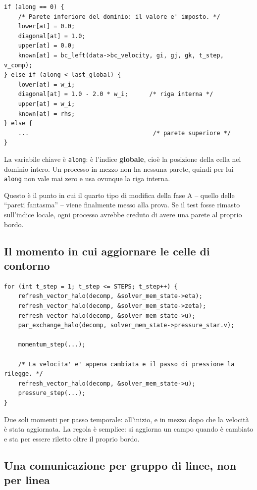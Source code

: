 \documentclass[11pt,a4paper]{article}
\newcommand{\cd}[1]{\texttt{\small #1}}
\begin{document}
\begin{lstlisting}
if (along == 0) {
    /* Parete inferiore del dominio: il valore e' imposto. */
    lower[at] = 0.0;
    diagonal[at] = 1.0;
    upper[at] = 0.0;
    known[at] = bc_left(data->bc_velocity, gi, gj, gk, t_step, v_comp);
} else if (along < last_global) {
    lower[at] = w_i;
    diagonal[at] = 1.0 - 2.0 * w_i;      /* riga interna */
    upper[at] = w_i;
    known[at] = rhs;
} else {
    ...                                   /* parete superiore */
}
\end{lstlisting}

La variabile chiave è \cd{along}: è l'indice \textbf{globale}, cioè la
posizione della cella nel dominio intero. Un processo in mezzo non ha nessuna
parete, quindi per lui \cd{along} non vale mai zero e usa ovunque la riga
interna.

Questo è il punto in cui il quarto tipo di modifica della fase A -- quello
delle ``pareti fantasma'' -- viene finalmente messo alla prova. Se il test
fosse rimasto sull'indice locale, ogni processo avrebbe creduto di avere una
parete al proprio bordo.

\subsection*{Il momento in cui aggiornare le celle di contorno}

\begin{lstlisting}
for (int t_step = 1; t_step <= STEPS; t_step++) {
    refresh_vector_halo(decomp, &solver_mem_state->eta);
    refresh_vector_halo(decomp, &solver_mem_state->zeta);
    refresh_vector_halo(decomp, &solver_mem_state->u);
    par_exchange_halo(decomp, solver_mem_state->pressure_star.v);

    momentum_step(...);

    /* La velocita' e' appena cambiata e il passo di pressione la rilegge. */
    refresh_vector_halo(decomp, &solver_mem_state->u);
    pressure_step(...);
}
\end{lstlisting}

Due soli momenti per passo temporale: all'inizio, e in mezzo dopo che la
velocità è stata aggiornata. La regola è semplice: si aggiorna un campo quando
è cambiato e sta per essere riletto oltre il proprio bordo.

\subsection*{Una comunicazione per gruppo di linee, non per linea}
\end{document}
